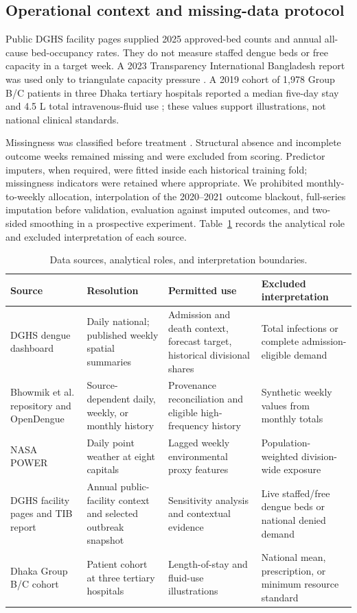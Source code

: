 \documentclass[11pt]{article}
\begin{document}
\subsection{Operational context and missing-data protocol}

Public DGHS facility pages supplied 2025 approved-bed counts and annual all-cause bed-occupancy rates. They do not measure staffed dengue beds or free capacity in a target week. A 2023 Transparency International Bangladesh report was used only to triangulate capacity pressure \citep{tib2023}. A 2019 cohort of 1,978 Group B/C patients in three Dhaka tertiary hospitals reported a median five-day stay and 4.5 L total intravenous-fluid use \citep{chowdhury2024}; these values support illustrations, not national clinical standards.

Missingness was classified before treatment \citep{little2019}. Structural absence and incomplete outcome weeks remained missing and were excluded from scoring. Predictor imputers, when required, were fitted inside each historical training fold; missingness indicators were retained where appropriate. We prohibited monthly-to-weekly allocation, interpolation of the 2020--2021 outcome blackout, full-series imputation before validation, evaluation against imputed outcomes, and two-sided smoothing in a prospective experiment. Table~\ref{tab:data} records the analytical role and excluded interpretation of each source.

\begin{table}[H]
\centering
\caption{Data sources, analytical roles, and interpretation boundaries.}
\label{tab:data}
\begin{threeparttable}
\small
\begin{tabularx}{\textwidth}{@{}p{}p{}X X@{}}
\toprule
Source & Resolution & Permitted use & Excluded interpretation \\
\midrule
DGHS dengue dashboard & Daily national; published weekly spatial summaries & Admission and death context, forecast target, historical divisional shares & Total infections or complete admission-eligible demand \\
Bhowmik et al. repository and OpenDengue & Source-dependent daily, weekly, or monthly history & Provenance reconciliation and eligible high-frequency history & Synthetic weekly values from monthly totals \\
NASA POWER & Daily point weather at eight capitals & Lagged weekly environmental proxy features & Population-weighted division-wide exposure \\
DGHS facility pages and TIB report & Annual public-facility context and selected outbreak snapshot & Sensitivity analysis and contextual evidence & Live staffed/free dengue beds or national denied demand \\
Dhaka Group B/C cohort & Patient cohort at three tertiary hospitals & Length-of-stay and fluid-use illustrations & National mean, prescription, or minimum resource standard \\
\bottomrule
\end{tabularx}
\end{threeparttable}
\end{table}
\end{document}

